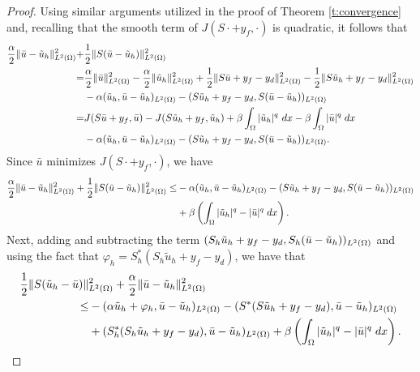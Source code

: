 {\begin{proof}
     Using similar arguments utilized in the proof of Theorem \ref{t:convergence} and, recalling that the smooth term of $J(S\cdot+y_f, \cdot)$ is quadratic, it follows that    
    \begin{align*}
        \frac{\alpha}{2}\lVert \bar u-\tilde u_h \rVert_{L^2(\Omega)}^2  +& \frac{1}{2}\lVert S(\bar u-\tilde u_h) \rVert_{L^2(\Omega)}^2\\ =&\frac{\alpha}{2}\lVert \bar u \rVert^2_{L^2(\Omega)}-\frac{\alpha}{2}\lVert \tilde u_h \rVert_{L^2(\Omega)}^2 +\frac{1}{2}\lVert S\bar u+y_f-y_d \rVert^2_{L^2(\Omega)}-\frac{1}{2}\lVert S\tilde u_h+y_f-y_d \rVert_{L^2(\Omega)}^2\\
        &-\alpha(\tilde u_h,\bar u-\tilde u_h)_{L^2(\Omega)}-(S\tilde u_h+y_f-y_d,S(\bar u-\tilde u_h))_{L^2(\Omega)}\\
        =&J(S\bar u+y_f,\bar u)-J(S\tilde u_h+y_f,\tilde u_h)+\beta\int_{\Omega} |\tilde u_h|^q\ dx-\beta\int_{\Omega}|\bar u|^q\; dx\\
        &-\alpha(\tilde u_h,\bar u-\tilde u_h)_{L^2(\Omega)}-(S\tilde u_h+y_f-y_d,S(\bar u-\tilde u_h))_{L^2(\Omega)}.
        \end{align*}
Since $\bar u$ minimizes $J(S \cdot +y_f,\cdot)$, we have 
        \begin{align}
               \frac{\alpha}{2}\lVert \bar u-\tilde u_h \rVert_{L^2(\Omega)}^2  + \frac{1}{2}\lVert S(\bar u-\tilde u_h) \rVert_{L^2(\Omega)}^2 \leq &  -\alpha(\tilde u_h,\bar u-\tilde u_h)_{L^2(\Omega)}-(S\tilde u_h+y_f-y_d,S(\bar u-\tilde u_h))_{L^2(\Omega)}\nonumber\\
        &+\beta \left(\int_{\Omega}|\tilde u_h|^q-|\bar u|^q\; dx\right). \label{eq:theorem_5_1}
        \end{align}
    Next, adding and subtracting the term $(S_h \tilde u_h+y_f-y_d,S_h(\bar u-\tilde u_h))_{L^2(\Omega)}$ and using the fact that $\varphi_h=S_h^*(S_h \tilde u_h+y_f-y_d)$, we have that
    \begin{equation} \label{eq:theorem_5_2_1}
       \begin{split}
          \frac{1}{2}\lVert S(\tilde u_h-\bar u) \rVert&_{L^2(\Omega)}^2+ \frac{\alpha}{2}\lVert \bar u-\tilde u_h \rVert_{L^2(\Omega)}^2 \\ \le& -(\alpha \tilde u_h+\varphi_h,\bar u-\tilde u_h)_{L^2(\Omega)}-(S^*(S\tilde u_h+y_f-y_d),\bar u-\tilde u_h)_{L^2(\Omega)} \\
          &+(S_h^*(S_h\tilde u_h+y_f-y_d),\bar u-\tilde u_h)_{L^2(\Omega)}+\beta \left(\int_{\Omega}|\tilde u_h|^q-|\bar u|^q\; dx\right). 
    \end{split}   
    \end{equation}

\end{proof}}
